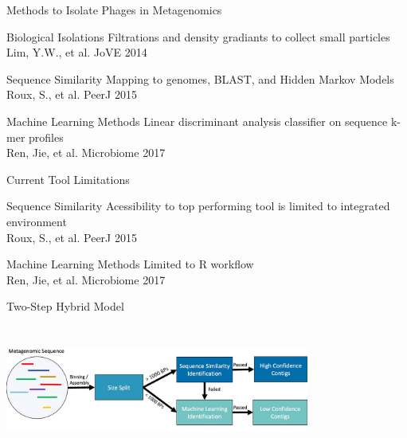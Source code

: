 \documentclass[11pt, xcolor=table]{beamer}
\begin{document}
  \begin{frame}{Methods to Isolate Phages in Metagenomics}
  \begin{block}{Biological Isolations}
  Filtrations and density gradiants to collect small particles \\
  {\tiny Lim, Y.W., et al. JoVE 2014}
  \end{block}
  \begin{block}{Sequence Similarity}
  Mapping to genomes, BLAST, and Hidden Markov Models \\ 
  {\tiny Roux, S., et al. PeerJ 2015}
  \end{block}
  \begin{block}{Machine Learning Methods}
  Linear discriminant analysis classifier on sequence k-mer profiles \\
  {\tiny Ren, Jie, et al. Microbiome 2017}
  \end{block}
  \end{frame}
  \begin{frame}{Current Tool Limitations}
  \begin{block}{Sequence Similarity}
  Acessibility to top performing tool is limited to integrated environment \\
  {\tiny Roux, S., et al. PeerJ 2015}
  \end{block}
  \begin{block}{Machine Learning Methods}
  Limited to R workflow \\
  {\tiny Ren, Jie, et al. Microbiome 2017}
  \end{block}
  \end{frame}
  \begin{frame}{Two-Step Hybrid Model}
  \center
	\includegraphics[height=5cm, width=10cm]{CPBS_11_18/TwoStep.jpg}
  
  \end{frame}
\end{document}
